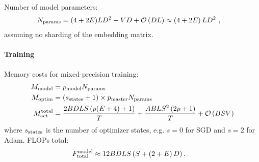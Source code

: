 Number of model parameters:
\begin{align}
	N _{ {\rm params} } & =   (4+2E)LD ^{ 2 } + VD+ \mathcal{O} \left( DL \right) \approx   \left ( 4+2E \right )LD ^{ 2 }\ ,
\end{align}
assuming no sharding of the embedding matrix.


\paragraph{Training}

Memory costs for mixed-precision training:
\begin{align}
	M _{ {\rm model} }                   & =p _{ {\rm model} } N _{ {\rm params} } \nonumber\\
	M _{ {\rm optim} }                   & =  \left ( s _{ {\rm states} }+1 \right) \times p _{ {\rm master } } N _{ {\rm params} } \nonumber\\
	M _{ {\rm act}  } ^{ {\rm  total}  } & =\frac{ 2BDLS   \left ( p(E+4) + 1   \right ) }{ T }
	+ \frac{ ABLS ^{ 2 } \left ( 2p+1\right ) }{ T }  + \mathcal{O} \left( BSV \right)
\end{align}
where $ s _{ {\rm  states} } $ is the number of optimizer states, e.g. $ s=0 $ for SGD and $ s=2 $
for Adam. FLOPs total:
\begin{align}
	F _{ {\rm total}  } ^{ {\rm  model}  } & \approx 12 BDLS \left ( S + \left ( 2+E \right )D \right ) .
\end{align}


